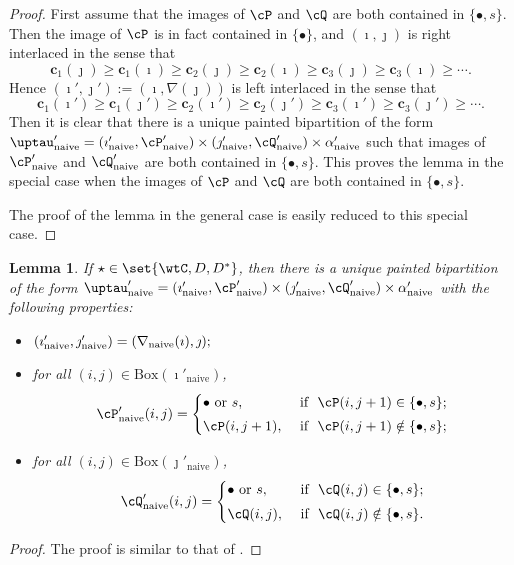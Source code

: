 \documentclass[12pt,a4paper]{amsart}
\def\DD{\nabla}
\numberwithin{equation}{section}
\newtheorem{lem}[thm]{Lemma}
\theoremstyle{remark}
\def\DD{\nabla}
\def\BOX#1{\mathrm{Box}(#1)}
\def\tnaive{\mathrm{naive}}
\def\cPpn{\cP'_\mathrm{naive}}
\def\cQpn{\cQ'_\mathrm{naive}}
\def\uptaupn{\uptau'_{\tnaive}}
\def\alphapn{\alpha'_{\tnaive}}
\def\imathpn{\imath'_{\tnaive}}
\def\jmathpn{\jmath'_{\tnaive}}
\def\DD{\nabla}
\begin{document}
   \begin{proof}
    First assume that the images of $\cP$ and $\cQ$ are both contained in $\{\bullet, s\}$. Then  the image of $\cP$  is in fact contained in $\{\bullet\}$, and $(\imath, \jmath)$ is  right interlaced in the sense that
 \[
 \mathbf{c}_1(\jmath)\geq \mathbf{c}_1(\imath)\geq \mathbf{c}_2(\jmath)\geq \mathbf{c}_2(\imath)\geq \mathbf{c}_3(\jmath)\geq \mathbf{c}_3(\imath) \geq \cdots.
 \]
 Hence $ (\imath',\jmath'):= (\imath,\DD(\jmath))$ is left interlaced in the sense that
 \[
 \mathbf{c}_1(\imath')\geq \mathbf{c}_1(\jmath')\geq \mathbf{c}_2(\imath')\geq \mathbf{c}_2(\jmath')\geq \mathbf{c}_3(\imath')\geq \mathbf{c}_3(\jmath') \geq \cdots.
 \]
 Then it is clear that there is a unique painted bipartition of the form  $\uptaupn=(\imathpn,\cPpn)\times (\jmathpn,\cQpn)\times \alphapn$ such that images of $\cPpn$ and $\cQpn$ are both contained in $\{\bullet, s\}$. This proves the lemma in the special case when the images of $\cP$ and $\cQ$ are both contained in $\{\bullet, s\}$.

 The proof of the lemma in the general case is easily reduced to this special case.
   \end{proof}
    \begin{lem}\label{lemDDn2}
    If $\star \in \set{ \wtC, D,D^*}$, then there is a unique painted bipartition of the form $\uptaupn= (\imathpn,\cPpn)\times (\jmathpn,\cQpn)\times \alphapn$ with the following properties:
  \begin{itemize}
        \item $
   (\imathpn,\jmathpn)= (\DD_\mathrm{naive}(\imath),\jmath); \smallskip
   $
   \item for all $(i,j)\in \BOX{\imathpn}$,
   \[
     \cPpn(i,j)=\begin{cases}
    \bullet \textrm{ or } s,&\textrm{ if  $\ \cP(i,j+1)\in \{\bullet, s\}$;} \smallskip \\
  \cP(i,j+1),& \textrm{ if $\ \cP(i,j+1)\notin \{\bullet, s\}$};\end{cases}
   \]
   \item for all $(i,j)\in \BOX
          {\jmathpn}$,
   \[
     \cQpn(i,j)=\begin{cases}
    \bullet \textrm{ or } s,&\textrm{ if  $\ \cQ(i,j)\in \{\bullet, s\}$;} \smallskip \\
  \cQ(i,j), & \textrm{ if $\ \cQ(i,j)\notin \{\bullet, s\}$}.  \end{cases}
   \]

    \end{itemize}
\end{lem}
\begin{proof}
  The proof is similar to that of .
\end{proof}
\end{document}
